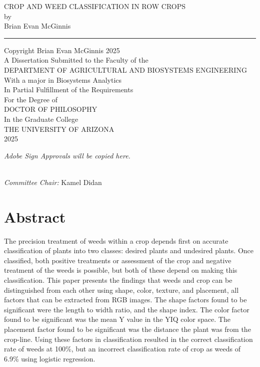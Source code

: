 \documentclass[letterpaper]{article}
\begin{document}
\begin{center}
\huge
CROP AND WEED CLASSIFICATION IN ROW CROPS \\
\large
{} 
\vspace{3cm}
by\\
Brian Evan McGinnis \\
\vspace{1cm}
\hrule
\vspace{1cm}
Copyright \textcopyright  Brian Evan McGinnis 2025 \\
A Dissertation Submitted to the Faculty of the \\
DEPARTMENT OF AGRICULTURAL AND BIOSYSTEMS ENGINEERING \\
With a major in Biosystems Analytics \\
In Partial Fulfillment of the Requirements \\
For the Degree of \\
DOCTOR OF PHILOSOPHY \\
In the Graduate College \\
THE UNIVERSITY OF ARIZONA \\
2025 \\
\end{center}
\newpage
%
\begin{center}
\huge
\textit{Adobe Sign Approvals will be copied here.} \\\
\end{center}
\textit{Committee Chair:} Kamel Didan
\newpage

%
%
\tableofcontents
\listoffigures
\listoftables


\newpage

\section{Abstract}
The precision treatment of weeds within a crop depends first on accurate classification of plants into two classes: desired plants and undesired plants. Once classified, both positive treatments or assessment of the crop and negative treatment of the weeds is possible, but both of these depend on making this classification. This paper presents the findings that weeds and crop can be distinguished from each other using shape, color, texture, and placement, all factors that can be extracted from RGB images. The shape factors found to be significant were the length to width ratio, and the shape index. The color factor found to be significant was the mean Y value in the YIQ color space. The placement factor found to be significant was the distance the plant was from the crop-line. Using these factors in classification resulted in the correct classification rate of weeds at 100\%, but an incorrect classification rate of crop as weeds of 6.9\% using logistic regression.
\newpage
%
%
\end{document}
